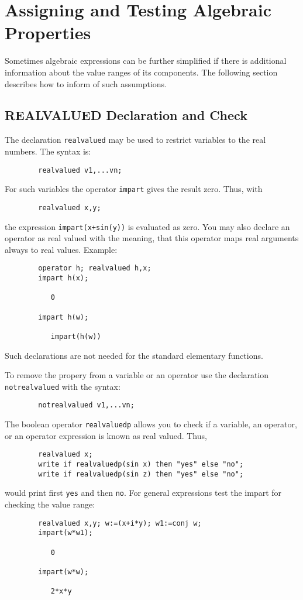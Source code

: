 \chapter{Assigning and Testing Algebraic Properties}

Sometimes algebraic expressions can be further simplified if
there is additional information about the value ranges
of its components. The following section describes 
how to inform {\REDUCE} of such assumptions.


\section{REALVALUED Declaration and Check}
\hypertarget{command:REALVALUED}{}
\hypertarget{command:NOTREALVALUED}{}

The declaration \texttt{realvalued} may be used 
to restrict variables to the real numbers. The syntax is:
\begin{verbatim}
        realvalued v1,...vn;
\end{verbatim}
For such variables the operator \texttt{impart} gives 
the result zero. Thus, with
\begin{verbatim}
        realvalued x,y;
\end{verbatim}
the expression \texttt{impart(x+sin(y))} is evaluated as zero.
You may also declare an operator as real valued
with the meaning, that this operator maps real arguments always to
real values. Example:
\begin{verbatim}
        operator h; realvalued h,x;
        impart h(x);
   
           0
  
        impart h(w);

           impart(h(w))
\end{verbatim}
Such declarations are not needed for the standard elementary functions.
        
To remove the propery from a variable or an operator use the declaration
\texttt{notrealvalued} with the syntax:
\begin{verbatim}
        notrealvalued v1,...vn;
\end{verbatim}

\hypertarget{operator:REALVALUEDP}{}
The boolean operator \texttt{realvaluedp}
allows you to check if a variable, an operator, or
an operator expression is known as real valued.
Thus, 
\begin{verbatim}
        realvalued x;
        write if realvaluedp(sin x) then "yes" else "no";
        write if realvaluedp(sin z) then "yes" else "no";
\end{verbatim}
would print first \texttt{yes} and then \texttt{no}. For general
expressions test the impart for checking the value range:
\begin{verbatim}
        realvalued x,y; w:=(x+i*y); w1:=conj w;
        impart(w*w1);

           0

        impart(w*w);

           2*x*y
\end{verbatim}

